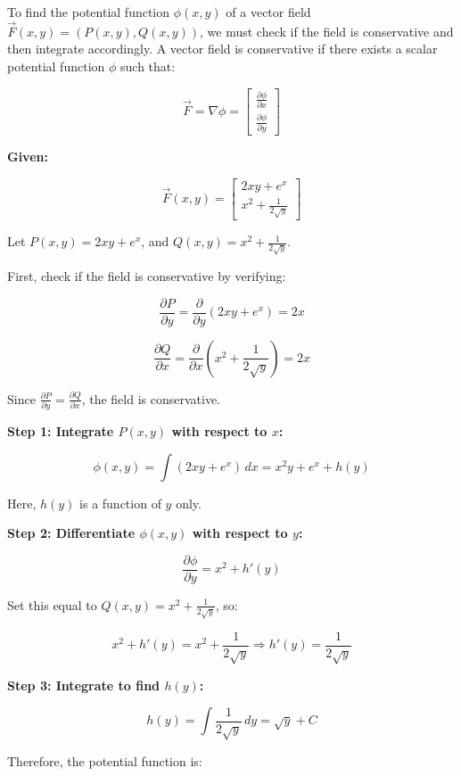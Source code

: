 To find the potential function \( \phi(x, y) \) of a vector field \( \vec{F}(x, y) = (P(x, y), Q(x, y)) \), 
we must check if the field is conservative and then integrate accordingly. A vector field is conservative 
if there exists a scalar potential function \( \phi \) such that:

\[
    \vec{F} = \nabla \phi = 
    \begin{bmatrix}
        \frac{\partial \phi}{\partial x} \\ 
        \frac{\partial \phi}{\partial y}
    \end{bmatrix} 
\]

\textbf{Given:}

\[
    \vec{F}(x, y) = 
    \begin{bmatrix}
    2xy + e^x \\
    x^2 + \frac{1}{2\sqrt{y}}
    \end{bmatrix}
\]

Let \( P(x, y) = 2xy + e^x \), and \( Q(x, y) = x^2 + \frac{1}{2\sqrt{y}} \).

First, check if the field is conservative by verifying:

\[
    \frac{\partial P}{\partial y} = \frac{\partial}{\partial y}(2xy + e^x) = 2x
\]

\[
    \frac{\partial Q}{\partial x} = \frac{\partial}{\partial x}\left(x^2 + \frac{1}{2\sqrt{y}}\right) 
    = 2x
\]

Since \( \frac{\partial P}{\partial y} = \frac{\partial Q}{\partial x} \), the field is conservative.

\textbf{Step 1: Integrate \( P(x, y) \) with respect to \(x\):}

\[
    \phi(x, y) = \int (2xy + e^x)\,dx = x^2y + e^x + h(y)
\]

Here, \( h(y) \) is a function of \(y\) only.

\textbf{Step 2: Differentiate \( \phi(x, y) \) with respect to \(y\):}

\[
    \frac{\partial \phi}{\partial y} = x^2 + h'(y)
\]

Set this equal to \( Q(x, y) = x^2 + \frac{1}{2\sqrt{y}} \), so:

\[
    x^2 + h'(y) = x^2 + \frac{1}{2\sqrt{y}} \Rightarrow h'(y) = \frac{1}{2\sqrt{y}}
\]

\textbf{Step 3: Integrate to find \( h(y) \):}

\[
    h(y) = \int \frac{1}{2\sqrt{y}}\,dy = \sqrt{y} + C
\]

Therefore, the potential function is:

